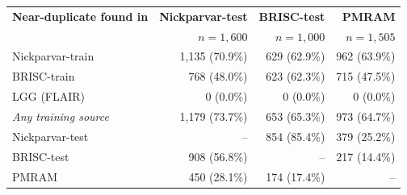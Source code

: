 \begin{tabular}{l r r r }
\toprule
\textbf{Near-duplicate found in} & \textbf{Nickparvar-test} & \textbf{BRISC-test} & \textbf{PMRAM} \\
 & $n=1,600$ & $n=1,000$ & $n=1,505$ \\
\midrule
Nickparvar-train & 1,135 (70.9\%) & 629 (62.9\%) & 962 (63.9\%) \\
BRISC-train & 768 (48.0\%) & 623 (62.3\%) & 715 (47.5\%) \\
LGG (FLAIR) & 0 (0.0\%) & 0 (0.0\%) & 0 (0.0\%) \\
\textit{Any training source} & 1,179 (73.7\%) & 653 (65.3\%) & 973 (64.7\%) \\
\midrule
Nickparvar-test & -- & 854 (85.4\%) & 379 (25.2\%) \\
BRISC-test & 908 (56.8\%) & -- & 217 (14.4\%) \\
PMRAM & 450 (28.1\%) & 174 (17.4\%) & -- \\
\bottomrule
\end{tabular}

